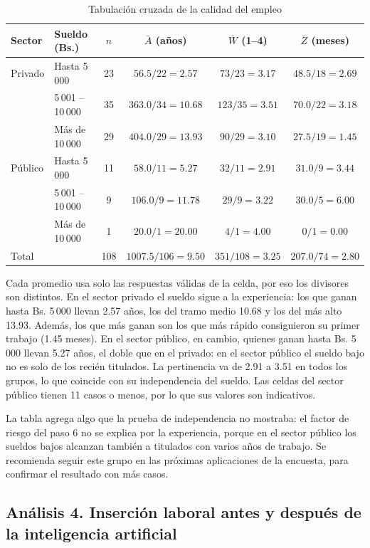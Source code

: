 \documentclass[12pt, a4paper]{article}
\newenvironment{mitabla}[2][H]{%
  \begin{table}[#1]
  \centering
  \caption{#2}
  \small
}{%
  \end{table}
}
\begin{document}
\begin{mitabla}{Tabulación cruzada de la calidad del empleo}\label{tab:a3-multi}
\begin{tabular}{llcccc}
\toprule
\textbf{Sector} & \textbf{Sueldo (Bs.)} & \textbf{$n$} & \textbf{$\bar{A}$ (años)} & \textbf{$\bar{W}$ (1--4)} & \textbf{$\bar{Z}$ (meses)} \\
\midrule
Privado & Hasta 5\,000 & 23 & $56.5/22 = 2.57$ & $73/23 = 3.17$ & $48.5/18 = 2.69$ \\
 & 5\,001 -- 10\,000 & 35 & $363.0/34 = 10.68$ & $123/35 = 3.51$ & $70.0/22 = 3.18$ \\
 & Más de 10\,000 & 29 & $404.0/29 = 13.93$ & $90/29 = 3.10$ & $27.5/19 = 1.45$ \\
Público & Hasta 5\,000 & 11 & $58.0/11 = 5.27$ & $32/11 = 2.91$ & $31.0/9 = 3.44$ \\
 & 5\,001 -- 10\,000 & 9 & $106.0/9 = 11.78$ & $29/9 = 3.22$ & $30.0/5 = 6.00$ \\
 & Más de 10\,000 & 1 & $20.0/1 = 20.00$ & $4/1 = 4.00$ & $0/1 = 0.00$ \\
\midrule
\multicolumn{2}{l}{Total} & 108 & $1007.5/106 = 9.50$ & $351/108 = 3.25$ & $207.0/74 = 2.80$ \\
\bottomrule
\end{tabular}
\end{mitabla}

Cada promedio usa solo las respuestas válidas de la celda, por eso los
divisores son distintos. En el sector privado el sueldo sigue a la
experiencia: los que ganan hasta Bs. 5\,000 llevan 2.57 años, los del
tramo medio 10.68 y los del más alto 13.93. Además, los que más ganan son
los que más rápido consiguieron su primer trabajo (1.45 meses). En el
sector público, en cambio, quienes ganan hasta Bs. 5\,000 llevan 5.27
años, el doble que en el privado: en el sector público el sueldo bajo no
es solo de los recién titulados. La pertinencia va de 2.91 a 3.51 en
todos los grupos, lo que coincide con su independencia del sueldo. Las
celdas del sector público tienen 11 casos o menos, por lo que sus valores
son indicativos.

La tabla agrega algo que la prueba de independencia no mostraba: el
factor de riesgo del paso 6 no se explica por la experiencia, porque en
el sector público los sueldos bajos alcanzan también a titulados con
varios años de trabajo. Se recomienda seguir este grupo en las próximas
aplicaciones de la encuesta, para confirmar el resultado con más casos.

\subsection{Análisis 4. Inserción laboral antes y después de la inteligencia artificial}\label{sec:a4}
\end{document}
